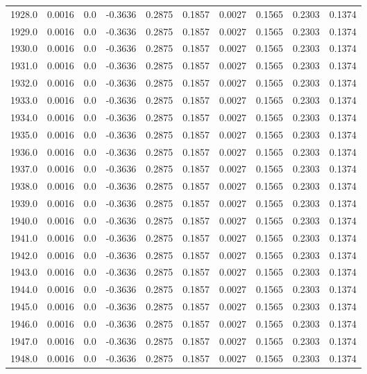 \begin{longtable}{lrrrrrrrrr}
1928.0 & 0.0016 & 0.0 & -0.3636 & 0.2875 & 0.1857 & 0.0027 & 0.1565 & 0.2303 & 0.1374 \\
1929.0 & 0.0016 & 0.0 & -0.3636 & 0.2875 & 0.1857 & 0.0027 & 0.1565 & 0.2303 & 0.1374 \\
1930.0 & 0.0016 & 0.0 & -0.3636 & 0.2875 & 0.1857 & 0.0027 & 0.1565 & 0.2303 & 0.1374 \\
1931.0 & 0.0016 & 0.0 & -0.3636 & 0.2875 & 0.1857 & 0.0027 & 0.1565 & 0.2303 & 0.1374 \\
1932.0 & 0.0016 & 0.0 & -0.3636 & 0.2875 & 0.1857 & 0.0027 & 0.1565 & 0.2303 & 0.1374 \\
1933.0 & 0.0016 & 0.0 & -0.3636 & 0.2875 & 0.1857 & 0.0027 & 0.1565 & 0.2303 & 0.1374 \\
1934.0 & 0.0016 & 0.0 & -0.3636 & 0.2875 & 0.1857 & 0.0027 & 0.1565 & 0.2303 & 0.1374 \\
1935.0 & 0.0016 & 0.0 & -0.3636 & 0.2875 & 0.1857 & 0.0027 & 0.1565 & 0.2303 & 0.1374 \\
1936.0 & 0.0016 & 0.0 & -0.3636 & 0.2875 & 0.1857 & 0.0027 & 0.1565 & 0.2303 & 0.1374 \\
1937.0 & 0.0016 & 0.0 & -0.3636 & 0.2875 & 0.1857 & 0.0027 & 0.1565 & 0.2303 & 0.1374 \\
1938.0 & 0.0016 & 0.0 & -0.3636 & 0.2875 & 0.1857 & 0.0027 & 0.1565 & 0.2303 & 0.1374 \\
1939.0 & 0.0016 & 0.0 & -0.3636 & 0.2875 & 0.1857 & 0.0027 & 0.1565 & 0.2303 & 0.1374 \\
1940.0 & 0.0016 & 0.0 & -0.3636 & 0.2875 & 0.1857 & 0.0027 & 0.1565 & 0.2303 & 0.1374 \\
1941.0 & 0.0016 & 0.0 & -0.3636 & 0.2875 & 0.1857 & 0.0027 & 0.1565 & 0.2303 & 0.1374 \\
1942.0 & 0.0016 & 0.0 & -0.3636 & 0.2875 & 0.1857 & 0.0027 & 0.1565 & 0.2303 & 0.1374 \\
1943.0 & 0.0016 & 0.0 & -0.3636 & 0.2875 & 0.1857 & 0.0027 & 0.1565 & 0.2303 & 0.1374 \\
1944.0 & 0.0016 & 0.0 & -0.3636 & 0.2875 & 0.1857 & 0.0027 & 0.1565 & 0.2303 & 0.1374 \\
1945.0 & 0.0016 & 0.0 & -0.3636 & 0.2875 & 0.1857 & 0.0027 & 0.1565 & 0.2303 & 0.1374 \\
1946.0 & 0.0016 & 0.0 & -0.3636 & 0.2875 & 0.1857 & 0.0027 & 0.1565 & 0.2303 & 0.1374 \\
1947.0 & 0.0016 & 0.0 & -0.3636 & 0.2875 & 0.1857 & 0.0027 & 0.1565 & 0.2303 & 0.1374 \\
1948.0 & 0.0016 & 0.0 & -0.3636 & 0.2875 & 0.1857 & 0.0027 & 0.1565 & 0.2303 & 0.1374 \\

\end{longtable}
